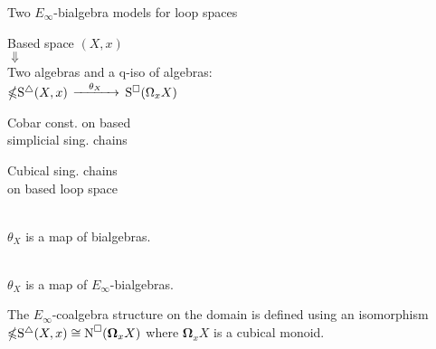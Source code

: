 \begin{frame}[fragile]{Two $E_\infty$-bialgebra models for loop spaces}
	\pause
	\vspace*{-1pt}
	\begin{center}
		Based space $(X,x)$ \\ \pause
		$\Downarrow$ \\
		Two algebras
		and a q-iso of algebras: \\
		\medskip
		$\mathbb{\Omega} \mathrm{S}^{\triangle}(X, x)$
		$\xrightarrow{\quad \theta_X \quad }$
		$\mathrm{S}^{\square}(\Omega_x X)$
	\end{center}

	\begin{minipage}{.45\textwidth}
		\begin{flushright}
			Cobar const. on based \\
			simplicial sing. chains
		\end{flushright}
	\end{minipage}
	\hspace*{.9cm}
	\begin{minipage}{.4\textwidth}
		Cubical sing. chains \\
		on based loop space
	\end{minipage}

	\bigskip\smallskip\pause
	 \\
	$\theta_X$ is a map of bialgebras.

	\bigskip\pause
	 \\
	$\theta_X$ is a map of $E_\infty$-bialgebras.

	\bigskip\pause
	The $E_\infty$-coalgebra structure on the domain is defined using an isomorphism $\mathbb{\Omega} \mathrm{S}^{\triangle}(X, x) \cong \operatorname{N}^{\square}(\mathbf{\Omega}_x X)$ where $\mathbf{\Omega}_x X$ is a cubical monoid.
\end{frame}